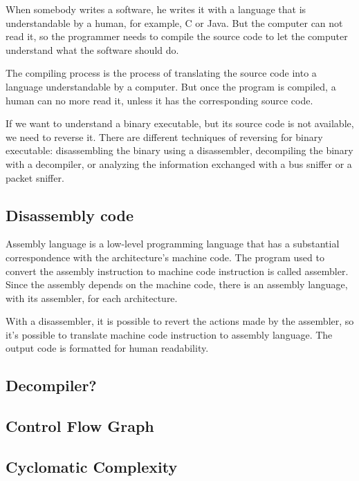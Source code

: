 When somebody writes a software, he writes it with a language that is understandable by a human, for example, C or Java.  But the computer can not read it, so the programmer needs to compile the source code to let the computer understand what the software should do. 

The compiling process is the process of translating the source code into a language understandable by a computer. But once the program is compiled, a human can no more read it, unless it has the corresponding source code. 

If we want to understand a binary executable, but its source code is not available, we need to reverse it. There are different techniques of reversing for binary executable: disassembling the binary using a disassembler, decompiling the binary with a decompiler, or analyzing the information exchanged with a bus sniffer or a packet sniffer.


\subsection{Disassembly code}

Assembly language is a low-level programming language that has a substantial correspondence with the architecture's machine code. The program used to convert the assembly instruction to machine code instruction is called assembler. Since the assembly depends on the machine code, there is an assembly language, with its assembler, for each architecture.

With a disassembler, it is possible to revert the actions made by the assembler, so it's possible to translate machine code instruction to assembly language. The output code is formatted for human readability.

\subsection{Decompiler?}

\subsection{Control Flow Graph}

\subsection{Cyclomatic Complexity}



